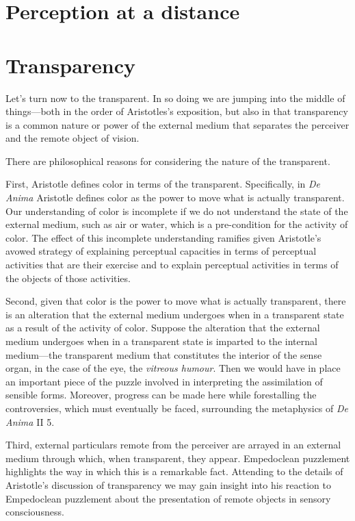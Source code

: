 \documentclass[12pt]{article}
\begin{document}

\section{Perception at a distance} %
\label{sec:perception_at_a_distance}




\section{Transparency} %
\label{sec:transparency}

Let's turn now to the transparent. In so doing we are jumping into the middle of things---both in the order of Aristotles's exposition, but also in that transparency is a common nature or power of the external medium that separates the perceiver and the remote object of vision.

There are philosophical reasons for considering the nature of the transparent.

First, Aristotle defines color in terms of the transparent. Specifically, in \emph{De Anima} Aristotle defines color as the power to move what is actually transparent. Our understanding of color is incomplete if we do not understand the state of the external medium, such as air or water, which is a pre-condition for the activity of color. The effect of this incomplete understanding ramifies given Aristotle's avowed strategy of explaining perceptual capacities in terms of perceptual activities that are their exercise and to explain perceptual activities in terms of the objects of those activities.

Second, given that color is the power to move what is actually transparent, there is an alteration that the external medium undergoes when in a transparent state as a result of the activity of color. Suppose the alteration that the external medium undergoes when in a transparent state is imparted to the internal medium---the transparent medium that constitutes the interior of the sense organ, in the case of the eye, the \emph{vitreous humour}. Then we would have in place an important piece of the puzzle involved in interpreting the assimilation of sensible forms. Moreover, progress can be made here while forestalling the controversies, which must eventually be faced, surrounding the metaphysics of \emph{De Anima} II 5.

Third, external particulars remote from the perceiver are arrayed in an external medium through which, when transparent, they appear. Empedoclean puzzlement highlights the way in which this is a remarkable fact. Attending to the details of Aristotle's discussion of transparency we may gain insight into his reaction to Empedoclean puzzlement about the presentation of remote objects in sensory consciousness.
\end{document}
